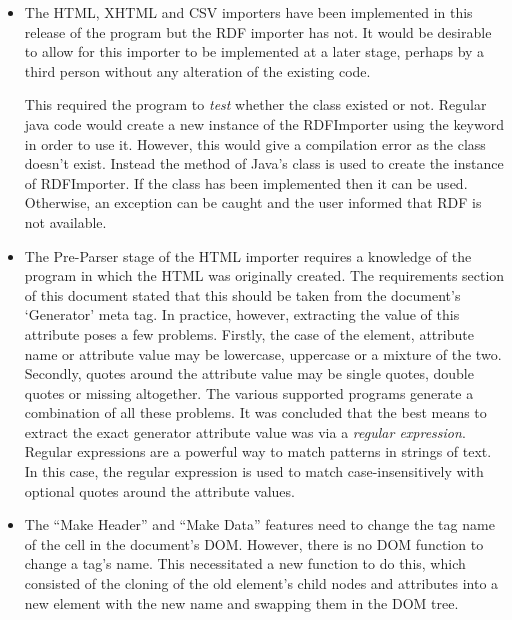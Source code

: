 \begin{itemize}

\item The HTML, XHTML and CSV importers have been implemented in this release
of the program but the RDF importer has not. It would be desirable to allow
for this importer to be implemented at a later stage, perhaps by a third person
without any alteration of the existing code. 

This required the program to \emph{test} whether the class existed or not.
Regular java code would create a new instance of the RDFImporter using the
 keyword in order to use it.  However, this would give a compilation
error as the class doesn't exist. Instead the  method of
Java's  class is used to create the instance of RDFImporter. If the
class has been implemented then it can be used. Otherwise, an exception can be
caught and the user informed that RDF is not available.

\item The Pre-Parser stage of the HTML importer requires a knowledge of the
program in which the HTML was originally created. The requirements section of
this document stated that this should be taken from the document's `Generator'
meta tag. In practice, however, extracting the value of this attribute poses a few problems. Firstly, the case of
the element, attribute name or attribute value may be lowercase, uppercase or a
mixture of the two. Secondly, quotes around the attribute value may be single
quotes, double quotes or missing altogether. The various supported programs
generate a combination of all these problems. It was concluded that the best
means to extract the exact generator attribute value was via a \emph{regular
expression}. Regular expressions are a powerful way to match patterns in
strings of text. In this case, the regular expression is used to match
case-insensitively with optional quotes around the attribute values.

\item The ``Make Header'' and ``Make Data'' features need to change the tag
name of the cell in the document's DOM. However, there is no DOM function
to change a tag's name. This necessitated a new function to do this, which 
consisted of the cloning of the old element's child nodes and attributes into
a new element with the new name and swapping them in the DOM tree.


\end{itemize}

